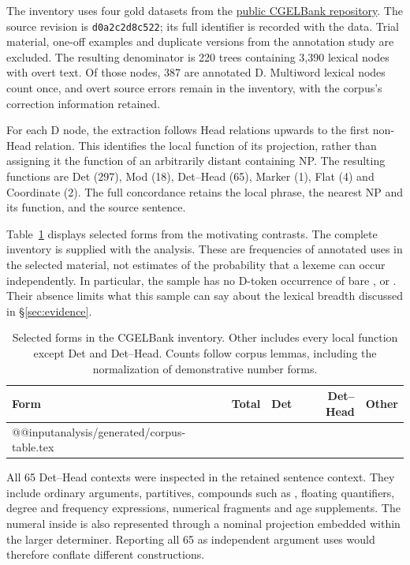 \documentclass[12pt]{article}
\makeatletter
\newcommand{\tablebody}[1]{\csname @@input\endcsname #1 }
\makeatother
\begin{document}
The inventory uses four gold datasets from the \href{https://github.com/nert-nlp/cgel}{public CGELBank repository}. The source revision is \texttt{d0a2c2d8c522}; its full identifier is recorded with the data. Trial material, one-off examples and duplicate versions from the annotation study are excluded. The resulting denominator is 220 trees containing 3,390 lexical nodes with overt text. Of those nodes, 387 are annotated D. Multiword lexical nodes count once, and overt source errors remain in the inventory, with the corpus's correction information retained.

For each D node, the extraction follows Head relations upwards to the first non-Head relation. This identifies the local function of its projection, rather than assigning it the function of an arbitrarily distant containing NP. The resulting functions are Det (297), Mod (18), Det--Head (65), Marker (1), Flat (4) and Coordinate (2). The full concordance retains the local phrase, the nearest NP and its function, and the source sentence.

Table~\ref{tab:corpus} displays selected forms from the motivating contrasts. The complete inventory is supplied with the analysis. These are frequencies of annotated uses in the selected material, not estimates of the probability that a lexeme can occur independently. In particular, the sample has no D-token occurrence of bare ,  or . Their absence limits what this sample can say about the lexical breadth discussed in §\ref{sec:evidence}.

\begin{table}[tb]
\centering\small
\caption{Selected forms in the CGELBank inventory. Other includes every local function except Det and Det--Head. Counts follow corpus lemmas, including the normalization of demonstrative number forms.}\label{tab:corpus}
\begin{tabular}{lrrrr}
\toprule
Form & Total & Det & Det--Head & Other \\
\midrule
\tablebody{analysis/generated/corpus-table.tex}
\bottomrule
\end{tabular}
\end{table}

All 65 Det--Head contexts were inspected in the retained sentence context. They include ordinary arguments, partitives, compounds such as , floating quantifiers, degree and frequency expressions, numerical fragments and age supplements. The numeral inside  is also represented through a nominal projection embedded within the larger determiner. Reporting all 65 as independent argument uses would therefore conflate different constructions.
\end{document}

